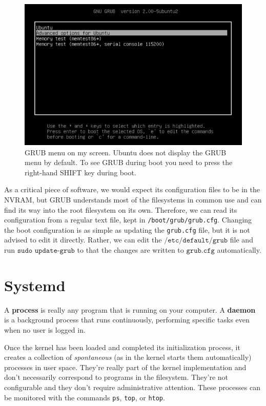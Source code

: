 \documentclass{article}
\begin{document}
    \begin{figure}[H]
      \centering 
      \includegraphics[scale=0.4]{img/grub2-in-ubuntu.png}
      \caption{GRUB menu on my screen. Ubuntu does not display the GRUB menu by default. To see GRUB during boot you need to press the right-hand SHIFT key during boot. } 
      \label{fig:grub}
    \end{figure}


    As a critical piece of software, we would expect its configuration files to be in the NVRAM, but GRUB understands most of the filesystems in common use and can find its way into the root filesystem on its own. Therefore, we can read its configuration from a regular text file, kept in \texttt{/boot/grub/grub.cfg}. Changing the boot configuration is as simple as updating the \texttt{grub.cfg} file, but it is not advised to edit it directly. Rather, we can edit the $\texttt{/etc/default/grub}$ file and run $\texttt{sudo update-grub}$ to that the changes are written to $\texttt{grub.cfg}$ automatically.  

\section{Systemd} 

  A \textbf{process} is really any program that is running on your computer. A \textbf{daemon} is a background process that runs continuously, performing specific tasks even when no user is logged in. 

  Once the kernel has been loaded and completed its initialization process, it creates a collection of \textit{spontaneous} (as in the kernel starts them automatically) processes in user space. They're really part of the kernel implementation and don't necessarily correspond to programs in the filesystem. They're not configurable and they don't require administrative attention. These processes can be monitored with the commands \texttt{ps}, \texttt{top}, or \texttt{htop}.
\end{document}
